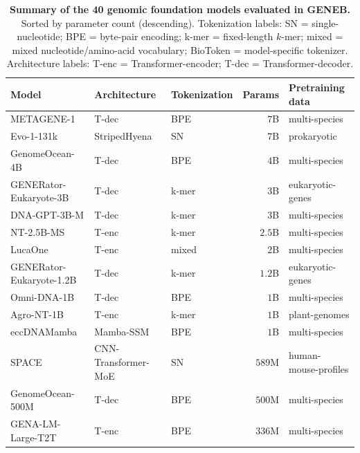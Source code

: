 \documentclass{article}
\theoremstyle{plain}
\theoremstyle{definition}
\theoremstyle{remark}
\begin{document}
\begin{table}[h]
\centering
\caption{\textbf{Summary of the 40 genomic foundation models evaluated in GENEB.}
Sorted by parameter count (descending). Tokenization labels: SN = single-nucleotide;
BPE = byte-pair encoding; k-mer = fixed-length $k$-mer; mixed = mixed
nucleotide/amino-acid vocabulary; BioToken = model-specific tokenizer.
Architecture labels: T-enc = Transformer-encoder; T-dec = Transformer-decoder.}
\label{tab:model_summary}
\footnotesize
\setlength{\tabcolsep}{4pt}
\renewcommand{\arraystretch}{1.05}
\begin{tabular}{@{}lllrl@{}}
\toprule
\textbf{Model} & \textbf{Architecture} & \textbf{Tokenization} & \textbf{Params} & \textbf{Pretraining data} \\
\midrule
METAGENE-1                & T-dec               & BPE        & $7$B   & multi-species \\
Evo-1-131k                & StripedHyena        & SN         & $7$B   & prokaryotic \\
GenomeOcean-4B            & T-dec               & BPE        & $4$B   & multi-species \\
GENERator-Eukaryote-3B    & T-dec               & k-mer      & $3$B   & eukaryotic-genes \\
DNA-GPT-3B-M              & T-dec               & k-mer      & $3$B   & multi-species \\
NT-2.5B-MS                & T-enc               & k-mer      & $2.5$B & multi-species \\
LucaOne                   & T-enc               & mixed      & $2$B   & multi-species \\
GENERator-Eukaryote-1.2B  & T-dec               & k-mer      & $1.2$B & eukaryotic-genes \\
Omni-DNA-1B               & T-dec               & BPE        & $1$B   & multi-species \\
Agro-NT-1B                & T-enc               & k-mer      & $1$B   & plant-genomes \\
eccDNAMamba               & Mamba-SSM           & BPE        & $1$B   & multi-species \\
SPACE                     & CNN-Transformer-MoE & SN         & $589$M & human-mouse-profiles \\
GenomeOcean-500M          & T-dec               & BPE        & $500$M & multi-species \\
GENA-LM-Large-T2T         & T-enc               & BPE        & $336$M & multi-species \\

\end{tabular}
\end{table}
\end{document}
